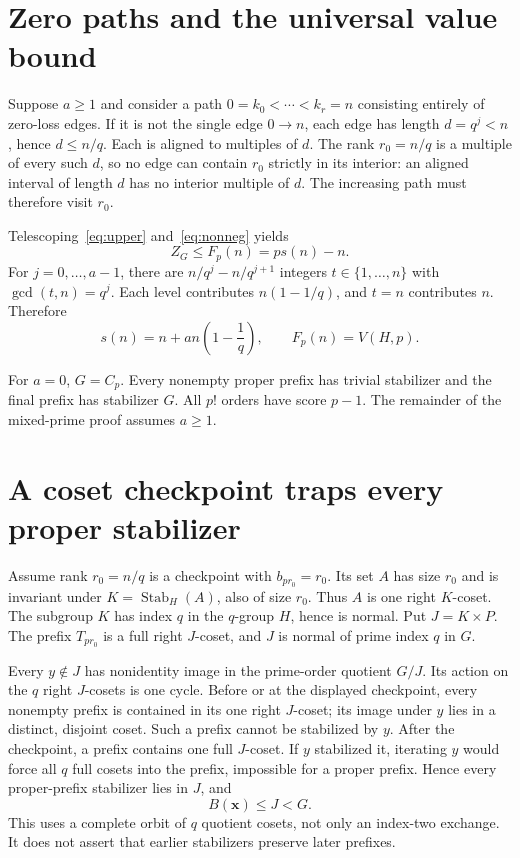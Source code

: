 \documentclass[11pt,letterpaper]{article}
\theoremstyle{definition}
\newcommand{\Stab}{\operatorname{Stab}}
\begin{document}
\section{Zero paths and the universal value bound}
Suppose $a\ge1$ and consider a path $0=k_0<\cdots<k_r=n$ consisting entirely of zero-loss edges. If it is not the single edge $0\to n$, each edge has length $d=q^j<n$, hence $d\le n/q$. Each is aligned to multiples of $d$. The rank $r_0=n/q$ is a multiple of every such $d$, so no edge can contain $r_0$ strictly in its interior: an aligned interval of length $d$ has no interior multiple of $d$. The increasing path must therefore visit $r_0$.

Telescoping~\eqref{eq:upper} and~\eqref{eq:nonneg} yields
\[
Z_G\le F_p(n)=ps(n)-n.
\]
For $j=0,\ldots,a-1$, there are $n/q^j-n/q^{j+1}$ integers $t\in\{1,\ldots,n\}$ with $\gcd(t,n)=q^j$. Each level contributes $n(1-1/q)$, and $t=n$ contributes $n$. Therefore
\begin{equation}
s(n)=n+an\left(1-\frac1q\right),\qquad F_p(n)=V(H,p).\label{eq:sumgcd}
\end{equation}

For $a=0$, $G=C_p$. Every nonempty proper prefix has trivial stabilizer and the final prefix has stabilizer $G$. All $p!$ orders have score $p-1$. The remainder of the mixed-prime proof assumes $a\ge1$.

\section{A coset checkpoint traps every proper stabilizer}
Assume rank $r_0=n/q$ is a checkpoint with $b_{pr_0}=r_0$. Its set $A$ has size $r_0$ and is invariant under $K=\Stab_H(A)$, also of size $r_0$. Thus $A$ is one right $K$-coset. The subgroup $K$ has index $q$ in the $q$-group $H$, hence is normal. Put $J=K\times P$. The prefix $T_{pr_0}$ is a full right $J$-coset, and $J$ is normal of prime index $q$ in $G$.

Every $y\notin J$ has nonidentity image in the prime-order quotient $G/J$. Its action on the $q$ right $J$-cosets is one cycle. Before or at the displayed checkpoint, every nonempty prefix is contained in its one right $J$-coset; its image under $y$ lies in a distinct, disjoint coset. Such a prefix cannot be stabilized by $y$. After the checkpoint, a prefix contains one full $J$-coset. If $y$ stabilized it, iterating $y$ would force all $q$ full cosets into the prefix, impossible for a proper prefix. Hence every proper-prefix stabilizer lies in $J$, and
\begin{equation}
B(\mathbf{x})\le J<G.\label{eq:trap}
\end{equation}
This uses a complete orbit of $q$ quotient cosets, not only an index-two exchange. It does not assert that earlier stabilizers preserve later prefixes.
\end{document}

